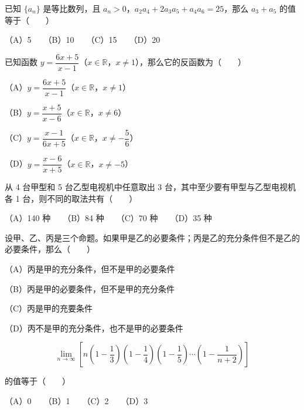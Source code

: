 \begin{question}

已知 $\{a_n\}$ 是等比数列，且 $a_n>0$，$a_2a_4+2a_3a_5+a_4a_6=25$，那么 $a_3+a_5$ 的值等于\mbox{（　　）}

（A）5　　（B）10　　（C）15　　（D）20

\end{question}
\begin{question}

已知函数 $y=\dfrac{6x+5}{x-1}$（$x\in\mathbb R$，$x\ne1$），那么它的反函数为\mbox{（　　）}

（A）$y=\dfrac{6x+5}{x-1}$（$x\in\mathbb R$，$x\ne1$）

（B）$y=\dfrac{x+5}{x-6}$（$x\in\mathbb R$，$x\ne6$）

（C）$y=\dfrac{x-1}{6x+5}$（$x\in\mathbb R$，$x\ne-\dfrac56$）

（D）$y=\dfrac{x-6}{x+5}$（$x\in\mathbb R$，$x\ne-5$）

\end{question}
\begin{question}

从 4 台甲型和 5 台乙型电视机中任意取出 3 台，其中至少要有甲型与乙型电视机各 1 台，则不同的取法共有\mbox{（　　）}

（A）140 种　　（B）84 种　　（C）70 种　　（D）35 种

\end{question}
\begin{question}

设甲、乙、丙是三个命题。如果甲是乙的必要条件；丙是乙的充分条件但不是乙的必要条件，那么\mbox{（　　）}

（A）丙是甲的充分条件，但不是甲的必要条件

（B）丙是甲的必要条件，但不是甲的充分条件

（C）丙是甲的充要条件

（D）丙不是甲的充分条件，也不是甲的必要条件

\end{question}
\begin{question}

\nopagebreak[4]
\[
\lim_{n\to\infty}\left[n\left(1-\frac13\right)\left(1-\frac14\right)\left(1-\frac15\right)\cdots\left(1-\frac1{n+2}\right)\right]
\]

的值等于\mbox{（　　）}

（A）0　　（B）1　　（C）2　　（D）3

\end{question}
